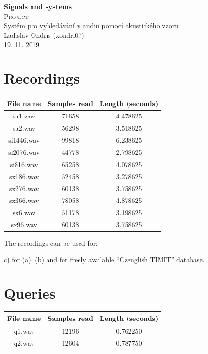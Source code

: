 \documentclass[11pt]{article}
\begin{document}
\begin{titlepage}
\center


\textbf{\Huge{Signals and systems}}
\\[4.0cm]

\textsc{\Huge {Project}}
\\[0.2cm]

\Large {Systém pro vyhledávání v audiu pomocí akustického vzoru}
\\[3.0cm]

\Large{Ladislav Ondris (xondri07)}
\\[0.7cm]
\Large{19. 11. 2019}

\end{titlepage}

\newpage

\section{Recordings}
\par

\begin{center}
\begin{tabular}{ |c|c|c| } 
 \hline
 File name & Samples read & Length (seconds) \\ 
 \hline
 sa1.wav &  71658 & 4.478625 \\ 
 sa2.wav & 56298 & 3.518625 \\ 
 si1446.wav & 99818 & 6.238625 \\ 
 si2076.wav & 44778 & 2.798625 \\ 
 si816.wav & 65258 & 4.078625 \\ 
 sx186.wav & 52458 & 3.278625 \\ 
 sx276.wav & 60138 & 3.758625 \\ 
 sx366.wav & 78058 & 4.878625 \\ 
 sx6.wav & 51178 &  3.198625 \\ 
 sx96.wav & 60138 & 3.758625 \\ 
 \hline
\end{tabular}
\end{center}
\par 
The recordings can be used for: 
\par
c) for (a), (b) and for freely available “Czenglish TIMIT” database. 

\section{Queries}
\begin{center}
\begin{tabular}{ |c|c|c| } 
 \hline
 File name & Samples read & Length (seconds) \\ 
 \hline
 q1.wav &  12196 & 0.762250 \\ 
 q2.wav & 12604 & 0.787750 \\ 
 \hline
\end{tabular}
\end{center}
\end{document}
